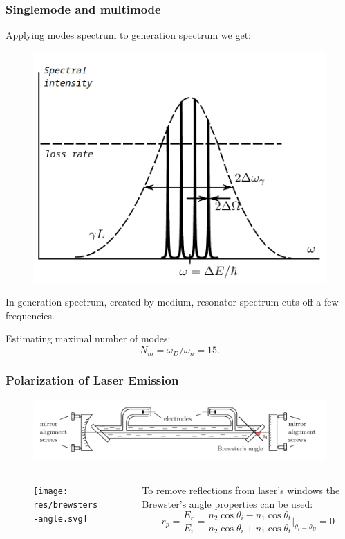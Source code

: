 \documentclass{beamer}
\begin{document}
	\begin{frame}
		\frametitle{Singlemode and multimode}
		
		Applying modes spectrum to generation spectrum we get:
		
		\begin{figure}
			\centering
			\includegraphics[width=0.6\linewidth]{res/overall_spectrum.png}
		\end{figure}
	
		In generation spectrum, created by medium, resonator spectrum cuts off a few frequencies.
		
		Estimating maximal number of modes:
		$$ N_m = \omega_D / \omega_n = 15.$$
	\end{frame}

	\begin{frame}
		\frametitle{Polarization of Laser Emission}
		\begin{figure}
			\centering
			\includegraphics[width=1\linewidth]{res/brewster_setup.pdf}
		\end{figure}
		
		\begin{columns}
			\begin{column}{0.3\textwidth}
				\begin{figure}
					\centering
					\texttt{[image: res/brewsters-angle.svg]}
				\end{figure}
			\end{column}
			\begin{column}{0.7\textwidth}
				To remove reflections from laser's windows the Brewster's angle properties can be used:
				$$r_p = \frac{E_r}{E_i} = \frac{n_2 \cos{\theta_i} - n_1 \cos{\theta_t}}{n_2 \cos{\theta_i} + n_1 \cos{\theta_t}}\bigg\rvert_{\theta_i = \theta_B} = 0$$
			\end{column}
		\end{columns}	
	\end{frame}
	
\end{document}
